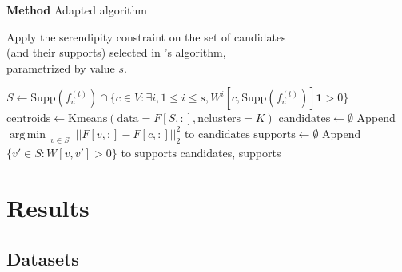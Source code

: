 \documentclass[10pt,frenchb]{beamer}
\DeclareMathOperator*{\argmin}{arg\,min\,}
\begin{document}
\begin{frame}{\textbf{Method} Adapted algorithm}

\begin{block}{}
\begin{center}
Apply the serendipity constraint on the set of candidates\\(and their supports) selected in \cite{lagree2017effective}'s algorithm,\\parametrized by value $s$.
\end{center}
\end{block}


\begin{algorithmic}[1]
\STATE $S \leftarrow \text{Supp}(f^{(t)}_{u}) \cap \{c \in V : \exists i, 1 \leq i \leq s, W^{i}[c, \text{Supp}(f^{(t)}_{u})]\textbf{1} > 0 \}$
\STATE $\text{centroids} \leftarrow \text{Kmeans}(\text{data}=F[S,:],\text{nclusters}=K)$
\STATE $\text{candidates} \leftarrow \emptyset$
\STATE Append $\argmin_{\substack{v \in S}} ||F[v, :]-F[c, :]||^{2}_2$ to $\text{candidates}$
\ENDFOR
\STATE $\text{supports} \leftarrow \emptyset$
\STATE Append $\{v' \in S : W[v,v'] > 0\}$ to $\text{supports}$
\ENDFOR
\RETURN candidates, supports
\end{algorithmic}

\end{frame}

\section{Results}

 \begin{frame}
 \tableofcontents[currentsection]
 \end{frame}

\subsection{Datasets}
\end{document}
